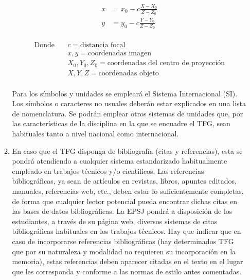 \begin{enumerate}
\begin{enumerate}
    \begin{equation}\label{eq:test}
      \begin{split}
        x &= x_0 - c \frac{X - X_0}{Z - Z_0}\\
        y &= y_0 - c \frac{Y- Y_0}{Z - Z_0}\\
      \end{split}
    \end{equation}

    \begin{equation}
      \begin{split}
        \text{Donde} \quad &c = \text{distancia focal}\\
                           & x, y = \text{coordenadas imagen}\\
                           & X_0, Y_0, Z_0 = \text{coordenadas del centro de proyección}\\
                           & X, Y, Z = \text{coordenadas objeto}\\
      \end{split}
    \end{equation}
    
    Para los símbolos y unidades se empleará el Sistema Internacional (SI). Los símbolos o
    caracteres no usuales deberán estar explicados en una lista de nomenclatura. Se podrán
    emplear otros sistemas de unidades que, por las características de la disciplina en la que se
    encuadre el TFG, sean habituales tanto a nivel nacional como internacional.
  \item En caso que el TFG disponga de bibliografía (citas y referencias), esta se pondrá atendiendo
    a cualquier sistema estandarizado habitualmente empleado en trabajos técnicos y/o
    científicos. Las referencias bibliográficas, ya sean de artículos en revistas, libros, apuntes
    editados, manuales, referencias web, etc., deben estar lo suficientemente completas, de forma
    que cualquier lector potencial pueda encontrar dichas citas en las bases de datos
    bibliográficas.    La EPSJ pondrá a disposición de los estudiantes, a través de su página web,
    diversos sistemas de citas bibliográficas habituales en los trabajos técnicos.
    Hay que indicar que en caso de incorporarse referencias bibliográficas (hay determinados TFG
    que por su naturaleza y modalidad no requieren su incorporación en la memoria), estas
    referencias deben aparecer citadas en  el texto en el lugar que les corresponda y conforme a
    las normas de estilo antes comentadas.
  \end{enumerate}
\end{enumerate}
